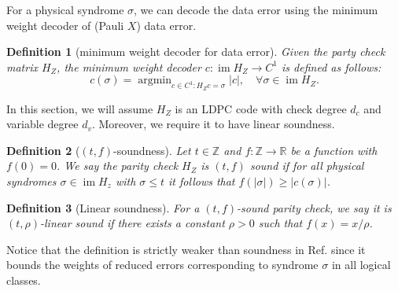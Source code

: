 \documentclass[twoside,english,aps,showpacs,pra,superscriptaddress]{revtex4-2}
\DeclareMathOperator{\im}{im}
\DeclareMathOperator*{\argmin}{argmin}
\newtheorem{definition}{Definition}
\begin{document}
For a physical syndrome $\sigma$, we can decode the data error using the minimum weight decoder of (Pauli $X$) data error.
\begin{definition}[minimum weight decoder for data error]
    Given the party check matrix $H_Z$, the minimum weight decoder $c: \im H_Z \rightarrow C^1$ is defined as follows: 
    \begin{equation}
        c(\sigma) = \argmin_{c \in C^1: H_Z c = \sigma}|c|, \quad \forall \sigma \in \im H_Z.
    \end{equation}
\end{definition}
In this section, we will assume $H_Z$ is an LDPC code with check degree $d_c$ and variable degree $d_v$. Moreover, we require it to have linear soundness.
\begin{definition}[$(t,f)$-soundness]
    Let $t\in \mathbb{Z}$ and $f : \mathbb{Z} \rightarrow \mathbb{R}$ be a function with $f (0) = 0$. We say the parity check $H_Z$ is $(t,f)$ sound if for all physical syndromes $\sigma \in \im H_z$ with $\sigma \leq t $ it follows that $f(|\sigma|) \geq |c(\sigma)|$.
\end{definition}
\begin{definition}[Linear soundness]
    For a $(t,f)$-sound parity check, we say it is $(t,\rho)$-linear sound if there exists a constant $\rho > 0$ such that $f(x) = x/ \rho$.
\end{definition}
Notice that the definition is strictly weaker than soundness in Ref. \cite{quintavalleSingleShotErrorCorrection2021} since it bounds the weights of reduced errors corresponding to syndrome $\sigma$ in all logical classes.
\end{document}
